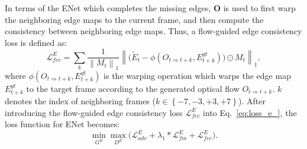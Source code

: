 In terms of the ENet which completes the missing edges, \(\boldsymbol{O}\) is used to first warp the neighboring edge maps to the current frame, and then compute the consistency between neighboring edge maps. 
%
Thus, a flow-guided edge consistency loss is defined as:
%
\begin{equation}
	\label{eq:flow_edge}
	\mathcal{L}^E_{fec}=\sum_{k}\frac{1}{\left\|M_{t} \right\|_1}\left\|\big(\widetilde{E}_{t}-\phi(O_{t\Rightarrow t+k},E_{t+k}^{gt})\big)\odot M_{t}\right\|_1,
\end{equation}
where $\phi(O_{t\Rightarrow t+k},E_{t+k}^{gt})$ is the warping operation which warps the edge map $E_{t+k}^{gt}$ to the target frame according to the generated optical flow $O_{t\Rightarrow t+k}$.
$k$ denotes the index of neighboring frames ($k\in \left\{-7,-3,+3,+7 \right\}$). 
After introducing the flow-guided edge consistency loss $\mathcal{L}^E_{fec}$ into Eq.~\eqref{eq:loss_e_}, the loss function for ENet becomes:
\begin{equation}
\label{eq:loss_e}
\min\limits_{G^E} \max \limits_{D^E} \big(\mathcal{L}^E_{adv}+\lambda_1 * \mathcal{L}^E_{fm}+\mathcal{L}^E_{fec}\big).
\end{equation}




